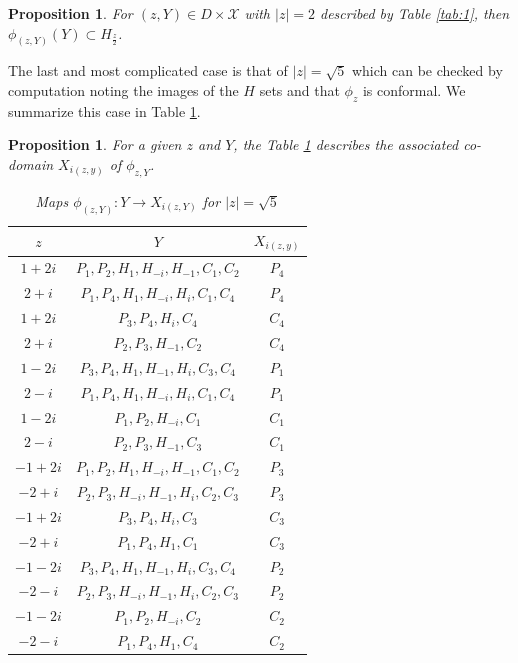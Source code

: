 \documentclass[11pt]{amsart}
\theoremstyle{plain}
\newtheorem{proposition}[theorem]{Proposition}
\theoremstyle{definition}
\renewcommand\~{\tilde}%
\newcommand{\cX}{\ensuremath{\mathcal{X}}}
\numberwithin{equation}{section}
\begin{document}
\begin{proposition}\label{edges5}
    For $(z,Y)\in D\times\cX$ with $|z|=2$ described by Table \ref{tab:1}, then $\phi_{(z,Y)}(Y)\subset H_{\frac{z}{2}}$.  
\end{proposition}

The last and most complicated case is that of $|z|=\sqrt{5}$ which can be checked by computation noting the images of the $H$ sets and that $\phi_z$ is conformal.  We summarize this case in Table \ref{tab:2}.

\begin{proposition}\label{edges6}
    For a given $z$ and $Y$, the Table \ref{tab:2} describes  the associated co-domain $X_{i(z,y)}$ of $\phi_{z,Y}$. 

    \begin{center}
\begin{table}[!ht]
\caption{Maps $\phi_{(z,Y)}:Y\to X_{i(z,Y)}$ for $|z|=\sqrt{5}$}
\label{tab:2}
\begin{tabular}{|c|c|c|}
\hline
$z$ & $Y$ & $X_{i(z,y)}$ \\
\hline
$1+2i$ & $P_1,P_2,H_1,H_{-i},H_{-1},C_1,C_2$ & $P_4$ \\
\hline
$2+i$ & $P_1,P_4,H_1,H_{-i},H_{i},C_1,C_4$ & $P_4$ \\
\hline
\hline
$1+2i$ & $P_3,P_4,H_{i},C_4$ & $C_4$ \\
\hline
$2+i$ & $P_2,P_3,H_{-1},C_2$ & $C_4$ \\
\hline
\hline
$1-2i$ & $P_3,P_4,H_1,H_{-1},H_{i},C_3,C_4$ & $P_1$ \\
\hline
$2-i$ & $P_1,P_4,H_1,H_{-i},H_{i},C_1,C_4$ & $P_1$ \\
\hline
\hline
$1-2i$ & $P_1,P_2,H_{-i},C_1$ & $C_1$ \\
\hline
$2-i$ & $P_2,P_3,H_{-1},C_3$ & $C_1$ \\
\hline
\hline
$-1+2i$ & $P_1,P_2,H_1,H_{-i},H_{-1},C_1,C_2$ & $P_3$ \\
\hline
$-2+i$ & $P_2,P_3,H_{-i},H_{-1},H_{i},C_2,C_3$ & $P_3$ \\
\hline
\hline
$-1+2i$ & $P_3,P_4,H_{i},C_3$ & $C_3$ \\
\hline
$-2+i$ & $P_1,P_4,H_{1},C_1$ & $C_3$ \\
\hline
\hline
$-1-2i$ & $P_3,P_4,H_1,H_{-1},H_{i},C_3,C_4$ & $P_2$ \\
\hline
$-2-i$ & $P_2,P_3,H_{-i},H_{-1},H_{i},C_2,C_3$ & $P_2$ \\
\hline
\hline
$-1-2i$ & $P_1,P_2,H_{-i},C_2$ & $C_2$ \\
\hline
$-2-i$ & $P_1,P_4,H_{1},C_4$ & $C_2$ \\
\hline
\end{tabular} 
\end{table}
\end{center}
\end{proposition}


\newpage


 
\end{document}
